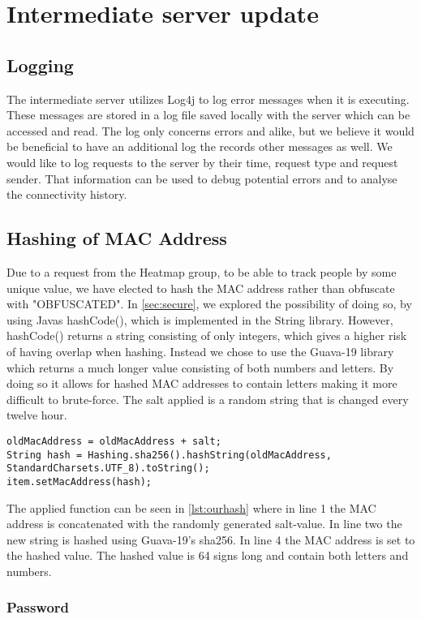 \section{Intermediate server update}

\subsection*{Logging}
The intermediate server utilizes Log4j \cite{log4j} to log error messages when it is executing. These messages are stored in a log file saved locally with the server which can be accessed and read. The log only concerns errors and alike, but we believe it would be beneficial to have an additional log the records other messages as well. We would like to log requests to the server by their time, request type and request sender. That information can be used to debug potential errors and to analyse the connectivity history. 

\subsection*{Hashing of MAC Address}
Due to a request from the Heatmap group, to be able to track people by some unique value, we have elected to hash the MAC address rather than obfuscate with "OBFUSCATED". In \cref{sec:secure}, we explored the possibility of doing so, by using Javas hashCode(), which is implemented in the String library. However, hashCode() returns a string consisting of only integers, which gives a higher risk of having overlap when hashing. Instead we chose to use the Guava-19 library which returns a much longer value consisting of both numbers and letters. By doing so it allows for hashed MAC addresses to contain letters making it more difficult to brute-force. The salt applied is a random string that is changed every twelve hour. 

\begin{lstlisting}[caption={Hashing a MAC address},label={lst:ourhash},language=inc_Java]
oldMacAddress = oldMacAddress + salt;
String hash = Hashing.sha256().hashString(oldMacAddress, 
StandardCharsets.UTF_8).toString();
item.setMacAddress(hash);
\end{lstlisting}

The applied function can be seen in \cref{lst:ourhash} where in line 1 the MAC address is concatenated with the randomly generated salt-value. In line two the new string is hashed using Guava-19's sha256. In line 4 the MAC address is set to the hashed value. The hashed value is 64 signs long and contain both letters and numbers.




\subsubsection*{Password}

